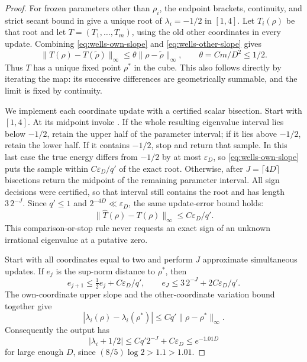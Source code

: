 \begin{proof}
For frozen parameters other than \(\rho_i\), the endpoint brackets,
continuity, and strict secant bound in 
give a unique root of \(\lambda_i=-1/2\) in \([1,4]\).
Let \(T_i(\rho)\) be that root and let
\(T=(T_1,\ldots,T_m)\), using the old other coordinates in every
update. Combining \eqref{eq:wells-own-slope} and
\eqref{eq:wells-other-slope} gives
\begin{equation}
 \|T(\rho)-T(\widetilde\rho)\|_\infty
 \le\theta\|\rho-\widetilde\rho\|_\infty,\qquad
 \theta=Cm/D^2\le1/2.
 \label{eq:wells-contraction}
\end{equation}
Thus \(T\) has a unique fixed point \(\rho^*\) in the cube.
This also follows directly by iterating the map: its successive
differences are geometrically summable, and the limit is fixed
by continuity.

We implement each coordinate update with a certified scalar
bisection. Start with \([1,4]\). At its midpoint invoke
. If the whole resulting eigenvalue interval
lies below \(-1/2\), retain the upper half of the parameter interval;
if it lies above \(-1/2\), retain the lower half. If it contains
\(-1/2\), stop and return that sample. In this last case the true
energy differs from \(-1/2\) by at most \(\varepsilon_D\), so
\eqref{eq:wells-own-slope} puts the sample within
\(C\varepsilon_D/q'\) of the exact root.
Otherwise, after \(J=\lceil4D\rceil\) bisections return the midpoint
of the remaining parameter interval. All sign decisions were
certified, so that interval still contains the root and has length
\(3\,2^{-J}\). Since \(q'\le1\) and
\(2^{-4D}\ll\varepsilon_D\), the same update-error bound holds:
\begin{equation}
 \|\widehat T(\rho)-T(\rho)\|_\infty
 \le C\varepsilon_D/q'.
 \label{eq:wells-update-error}
\end{equation}
This comparison-or-stop rule never requests an exact sign of an
unknown irrational eigenvalue at a putative zero.

Start with all coordinates equal to two and perform \(J\) approximate simultaneous
updates. If \(e_j\) is the sup-norm distance to \(\rho^*\), then
\[
 e_{j+1}\le\tfrac12 e_j+C\varepsilon_D/q',
 \qquad
 e_J\le3\,2^{-J}+2C\varepsilon_D/q'.
\]
The own-coordinate upper slope and the other-coordinate variation
bound together give
\[
 |\lambda_i(\rho)-\lambda_i(\rho^*)|
 \le Cq'\|\rho-\rho^*\|_\infty.
\]
Consequently the output has
\[
 |\lambda_i+1/2|
 \le Cq'2^{-J}+C\varepsilon_D
 \le e^{-1.01D}
\]
for large enough \(D\), since
\((8/5)\log2>1.1>1.01\).


\end{proof}

